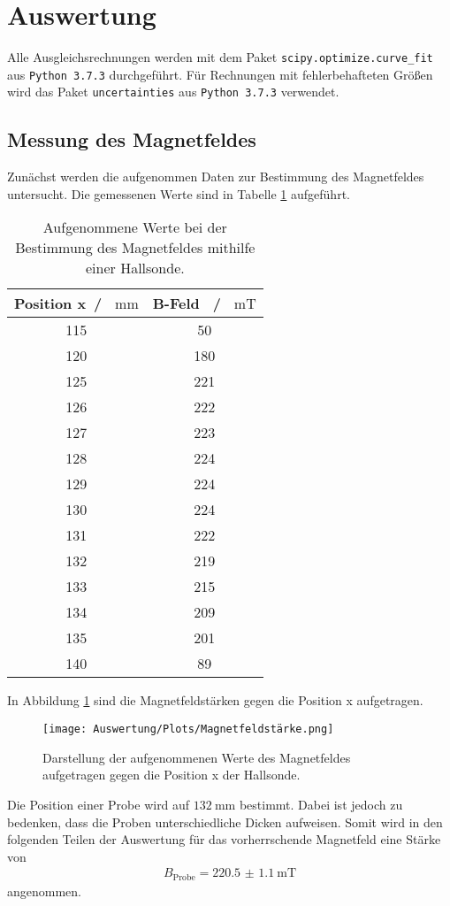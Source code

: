\section{Auswertung}
Alle Ausgleichsrechnungen werden mit dem Paket \texttt{scipy.optimize.curve\_fit}  aus \texttt{Python 3.7.3} durchgeführt.
Für Rechnungen mit fehlerbehafteten Größen wird das Paket \texttt{uncertainties} aus \texttt{Python 3.7.3} verwendet.

\subsection{Messung des Magnetfeldes}
Zunächst werden die aufgenommen Daten zur Bestimmung des Magnetfeldes untersucht. Die gemessenen Werte
sind in Tabelle \ref{tab:MF_Messung} aufgeführt.
\begin{table}[H]
    \centering
    \caption{Aufgenommene Werte bei der Bestimmung des Magnetfeldes mithilfe einer Hallsonde.}
    \label{tab:MF_Messung}
    \begin{tabular}{cc}
      \toprule
      Position x\, / \, $\si{\milli\meter}$ & B-Feld \, / \, $\si{\milli\tesla}$  \\
      \midrule
      115 & 50  \\
      120 & 180 \\
      125 & 221 \\
      126 & 222 \\
      127 & 223 \\
      128 & 224 \\
      129 & 224 \\
      130 & 224 \\
      131 & 222 \\
      132 & 219 \\
      133 & 215 \\
      134 & 209 \\
      135 & 201 \\
      140 & 89  \\
      \bottomrule
  \end{tabular}
 \end{table} \noindent
 In Abbildung \ref{fig:MF_Messung} sind die Magnetfeldstärken gegen die Position x aufgetragen.
 \begin{figure}[H]
     \centering
     \texttt{[image: Auswertung/Plots/Magnetfeldstärke.png]}
     \caption{Darstellung der aufgenommenen Werte des Magnetfeldes aufgetragen gegen die Position x der Hallsonde.}
     \label{fig:MF_Messung}
 \end{figure} \noindent
 Die Position einer Probe wird auf $\SI{132}{\milli\meter}$ bestimmt. Dabei ist jedoch zu bedenken,
 dass die Proben unterschiedliche Dicken aufweisen.
 Somit wird in den folgenden Teilen der Auswertung für das vorherrschende Magnetfeld eine Stärke von
 \begin{align*}
     B_\text{Probe} = \SI{220.5(11)}{\milli\tesla}
 \end{align*} \noindent
 angenommen.

